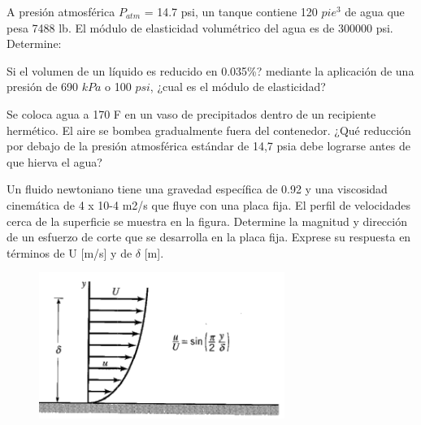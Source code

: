 \documentclass[12pt, a4paper]{exam}
\begin{document}
\begin{questions}
    \question A presión atmosférica $ P_{atm} $ = 14.7 psi, un tanque contiene 120 $pie^{3}$ de agua que pesa 7488 lb. El módulo de elasticidad volumétrico del agua es de 300000 psi. Determine:
    
 

    \question Si el volumen de un líquido es reducido en 0.035\%? mediante la aplicación de una presión de 690 $kPa$ o 100 $psi$, ¿cual es el módulo de elasticidad?
 
	\question Se coloca agua a 170 F en un vaso de precipitados dentro de un recipiente hermético. El aire se bombea gradualmente fuera del contenedor. ¿Qué reducción por debajo de la presión atmosférica estándar de 14,7 psia debe lograrse antes de que hierva el agua?

 \question 	Un fluido newtoniano tiene una gravedad específica de 0.92 y una viscosidad cinemática de 4 x 10-4 m2/s que fluye con una placa fija. El perfil de velocidades cerca de la superficie se muestra en la figura. Determine la magnitud y dirección de un esfuerzo de corte que se desarrolla en la placa fija. Exprese su respuesta en términos de U [m/s] y de $\delta$ [m].
 \begin{figure}[h]
    \includegraphics[width=8cm]{perfilVel.png}
    \centering
    \end{figure}


\end{questions}
\end{document}
